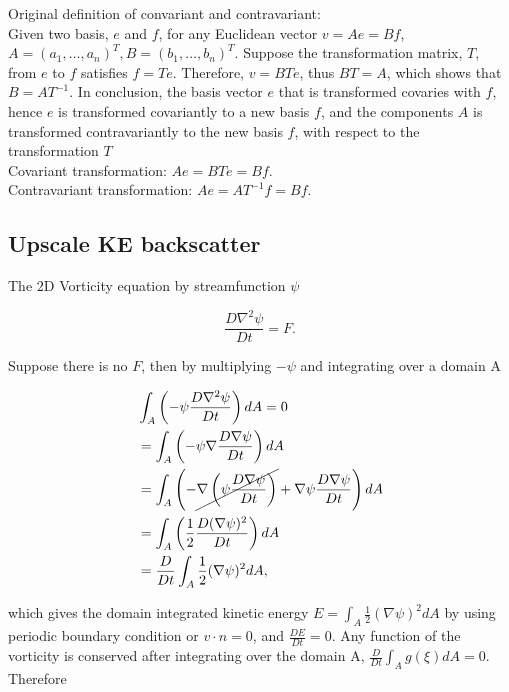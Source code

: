 Original definition of convariant and contravariant: \\
Given two basis, $e$ and $f$, for any Euclidean vector $v= A e= B f$, $A=(a_1,\dotsc,a_n)^T, B=(b_1,\dotsc,b_n)^T$. 
Suppose the transformation matrix, $T$, from $e$ to $f$ satisfies $f= Te$.
Therefore, $v= B T e$, thus $B T= A$, which shows that $B= A T^{-1}$. 
In conclusion, the basis vector $e$ that is transformed covaries with $f$, hence $e$ is transformed covariantly to a new basis $f$, and the components $A$ is transformed contravariantly to the new basis $f$, with respect to the transformation $T$  \\
Covariant transformation: $A e=  BTe= Bf$. \\
Contravariant transformation: $A e= AT^{-1} f= Bf$. \\
\subsection{Upscale KE backscatter}

The $2$D Vorticity equation by streamfunction $\psi$

\begin{equation}
   \frac{D \nabla^2\psi}{D t} = F.
\end{equation}

Suppose there is no $F$, then by multiplying $-\psi$ and integrating over a domain A

\begin{equation}
   \begin{aligned}
      & \int_A \left( -\psi \frac{D\nabla^2\psi}{Dt} \right) dA= 0 \\
      & = \int_A \left( -\psi \nabla\frac{D\nabla\psi}{Dt} \right) dA \\
      & = \int_A \left( -\cancel{\nabla \left( \psi \frac{D \nabla\psi}{Dt} \right)} + \nabla \psi \frac{D\nabla\psi}{Dt} \right) dA \\
      & = \int_A \left( \frac{1}{2} \frac{D(\nabla\psi)^2}{Dt} \right) dA \\ 
      & = \frac{D}{Dt} \int_A \frac{1}{2} (\nabla\psi)^2 dA,
   \end{aligned}
\end{equation}

which gives the domain integrated kinetic energy $E = \int_A\frac{1}{2} (\nabla\psi)^2 dA$ by using periodic boundary condition or $v \cdot n= 0$, and $\frac{D E}{Dt}=0$.
Any function of the vorticity is conserved after integrating over the domain A, $\frac{D}{Dt} \int_A g(\xi) dA= 0$. Therefore 

